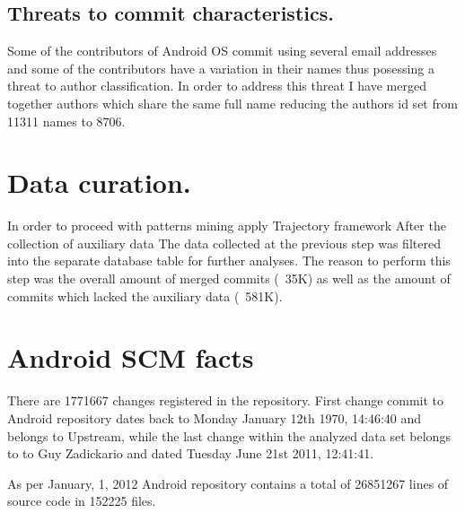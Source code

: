 \documentclass[a4paper,10pt]{article}
\numberwithin{equation}{subsection}
\begin{document}
\subsection{Threats to commit characteristics.}
Some of the contributors of Android OS commit using several email addresses and some of the 
contributors have a variation in their names thus posessing a threat to author classification.
In order to address this threat I have merged together authors which share the same full name
reducing the authors id set from 11311 names to 8706.

\section{Data curation.}
In order to proceed with patterns mining apply Trajectory framework After the collection of auxiliary data 
The data collected at the previous step was filtered into the separate database table for further analyses.
The reason to perform this step was the overall amount of merged commits (~35K) as well as the amount of 
commits which lacked the auxiliary data (~581K).

\section{Android SCM facts}
There are 1771667 changes registered in the repository. First change commit to Android repository dates back 
to Monday January 12th 1970, 14:46:40 and belongs to Upstream, while the last change
within the analyzed data set belongs to to Guy Zadickario and dated 
Tuesday June 21st 2011, 12:41:41.

As per January, 1, 2012 Android repository contains a total of 26851267 lines of source code in 
152225 files. 
\end{document}
